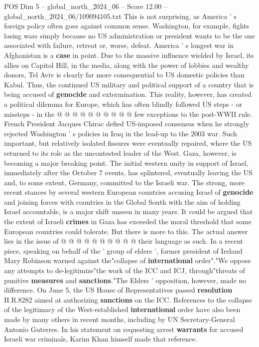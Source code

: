 \begin{textsample}{POS Dim 5 – global\_north\_2024\_06 – Score 12.00 – global\_north\_2024\_06/109094105.txt}
This is not surprising, as America ' s foreign policy often goes against common sense.
Washington, for example, fights losing wars simply because no US administration or president wants to be the one associated with failure, retreat or, worse, defeat.
America ' s longest war in Afghanistan is a \textbf{case} in point.
Due to the massive influence wielded by Israel, its allies on Capitol Hill, in the media, along with the power of lobbies and wealthy donors, Tel Aviv is clearly far more consequential to US domestic policies than Kabul.
Thus, the continued US military and political support of a country that is being accused of \textbf{genocide} and extermination.
This reality, however, has created a political dilemma for Europe, which has often blindly followed US steps - or missteps - in the @ @ @ @ @ @ @ @ @ @ few exceptions to the post-WWII rule.
French President Jacques Chirac defied US-imposed consensus when he strongly rejected Washington ' s policies in Iraq in the lead-up to the 2003 war.
Such important, but relatively isolated fissures were eventually repaired, where the US returned to its role as the uncontested leader of the West.
Gaza, however, is becoming a major breaking point.
The initial western unity in support of Israel, immediately after the October 7 events, has splintered, eventually leaving the US and, to some extent, Germany, committed to the Israeli war.
The strong, more recent stances by several western European countries accusing Israel of \textbf{genocide} and joining forces with countries in the Global South with the aim of holding Israel accountable, is a major shift unseen in many years.
It could be argued that the extent of Israeli \textbf{crimes} in Gaza has exceeded the moral threshold that some European countries could tolerate.
But there is more to this.
The actual answer lies in the issue of @ @ @ @ @ @ @ @ @ @ their language as such.
In a recent piece, speaking on behalf of the ' group of elders ', former president of Ireland Mary Robinson warned against the"collapse of \textbf{international} order"."We oppose any attempts to de-legitimize"the work of the ICC and ICJ, through"threats of punitive \textbf{measures} and \textbf{sanctions}."The Elders ' opposition, however, made no difference.
On June 5, the US House of Representatives passed \textbf{resolution} H.R.8282 aimed at authorizing \textbf{sanctions} on the ICC.
References to the collapse of the legitimacy of the West-established \textbf{international} order have also been made by many others in recent months, including by UN Secretary-General Antonio Guterres.
In his statement on requesting arrest \textbf{warrants} for accused Israeli war criminals, Karim Khan himself made that reference.

\end{textsample}
